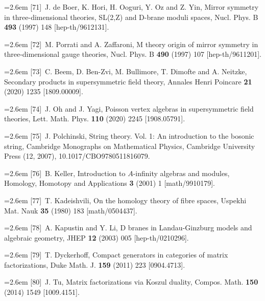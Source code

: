 \par\noindent\hangindent=2.6em [71]~J. de Boer, K. Hori, H. Ooguri, Y. Oz and Z. Yin, Mirror symmetry in three-dimensional theories, SL(2,Z) and D-brane moduli spaces, Nucl. Phys. B \textbf{493} (1997) 148 [hep-th/9612131].

\par\noindent\hangindent=2.6em [72]~M. Porrati and A. Zaffaroni, M theory origin of mirror symmetry in three-dimensional gauge theories, Nucl. Phys. B \textbf{490} (1997) 107 [hep-th/9611201].

\par\noindent\hangindent=2.6em [73]~C. Beem, D. Ben-Zvi, M. Bullimore, T. Dimofte and A. Neitzke, Secondary products in supersymmetric field theory, Annales Henri Poincare \textbf{21} (2020) 1235 [1809.00009].

\par\noindent\hangindent=2.6em [74]~J. Oh and J. Yagi, Poisson vertex algebras in supersymmetric field theories, Lett. Math. Phys. \textbf{110} (2020) 2245 [1908.05791].

\par\noindent\hangindent=2.6em [75]~J. Polchinski, String theory. Vol. 1: An introduction to the bosonic string, Cambridge Monographs on Mathematical Physics, Cambridge University Press (12, 2007), 10.1017/CBO9780511816079.

\par\noindent\hangindent=2.6em [76]~B. Keller, Introduction to $A$-infinity algebras and modules, Homology, Homotopy and Applications \textbf{3} (2001) 1 [math/9910179].

\par\noindent\hangindent=2.6em [77]~T. Kadeishvili, On the homology theory of fibre spaces, Uspekhi Mat. Nauk \textbf{35} (1980) 183 [math/0504437].

\par\noindent\hangindent=2.6em [78]~A. Kapustin and Y. Li, D branes in Landau-Ginzburg models and algebraic geometry, JHEP \textbf{12} (2003) 005 [hep-th/0210296].

\par\noindent\hangindent=2.6em [79]~T. Dyckerhoff, Compact generators in categories of matrix factorizations, Duke Math. J. \textbf{159} (2011) 223 [0904.4713].

\par\noindent\hangindent=2.6em [80]~J. Tu, Matrix factorizations via Koszul duality, Compos. Math. \textbf{150} (2014) 1549 [1009.4151].

